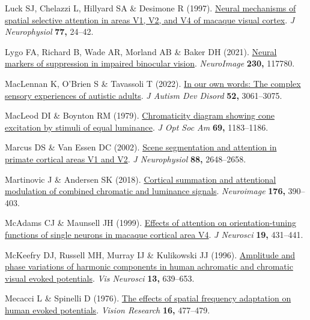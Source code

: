 \documentclass[
  letterpaper,
  DIV=11,
  numbers=noendperiod]{scrartcl}
\newlength{\cslhangindent}
\newenvironment{CSLReferences}[2] %
 {\begin{list}{}{%
  \setlength{\itemindent}{0pt}
  \setlength{\leftmargin}{0pt}
  \setlength{\parsep}{0pt}
  \ifodd #1
   \setlength{\leftmargin}{\cslhangindent}
   \setlength{\itemindent}{-1\cslhangindent}
  \fi
  \setlength{\itemsep}{#2\baselineskip}}}
 {\end{list}}
\begin{document}
\begin{CSLReferences}{1}{1}
Luck SJ, Chelazzi L, Hillyard SA \& Desimone R (1997).
\href{https://doi.org/10.1152/jn.1997.77.1.24}{Neural mechanisms of
spatial selective attention in areas V1, V2, and V4 of macaque visual
cortex}. \emph{J Neurophysiol} \textbf{77,} 24--42.

Lygo FA, Richard B, Wade AR, Morland AB \& Baker DH (2021).
\href{https://doi.org/10.1016/j.neuroimage.2021.117780}{Neural markers
of suppression in impaired binocular vision}. \emph{NeuroImage}
\textbf{230,} 117780.

MacLennan K, O'Brien S \& Tavassoli T (2022).
\href{https://doi.org/10.1007/s10803-021-05186-3}{In our own words: The
complex sensory experiences of autistic adults}. \emph{J Autism Dev
Disord} \textbf{52,} 3061--3075.

MacLeod DI \& Boynton RM (1979).
\href{https://doi.org/10.1364/josa.69.001183}{Chromaticity diagram
showing cone excitation by stimuli of equal luminance}. \emph{J Opt Soc
Am} \textbf{69,} 1183--1186.

Marcus DS \& Van Essen DC (2002).
\href{https://doi.org/10.1152/jn.00916.2001}{Scene segmentation and
attention in primate cortical areas V1 and V2}. \emph{J Neurophysiol}
\textbf{88,} 2648--2658.

Martinovic J \& Andersen SK (2018).
\href{https://doi.org/10.1016/j.neuroimage.2018.04.066}{Cortical
summation and attentional modulation of combined chromatic and luminance
signals}. \emph{Neuroimage} \textbf{176,} 390--403.

McAdams CJ \& Maunsell JH (1999).
\href{https://doi.org/10.1523/JNEUROSCI.19-01-00431.1999}{Effects of
attention on orientation-tuning functions of single neurons in macaque
cortical area V4}. \emph{J Neurosci} \textbf{19,} 431--441.

McKeefry DJ, Russell MH, Murray IJ \& Kulikowski JJ (1996).
\href{https://doi.org/10.1017/s0952523800008543}{Amplitude and phase
variations of harmonic components in human achromatic and chromatic
visual evoked potentials}. \emph{Vis Neurosci} \textbf{13,} 639--653.

Mecacci L \& Spinelli D (1976).
\href{https://doi.org/10.1016/0042-6989(76)90025-0}{The effects of
spatial frequency adaptation on human evoked potentials}. \emph{Vision
Research} \textbf{16,} 477--479.


\end{CSLReferences}
\end{document}
